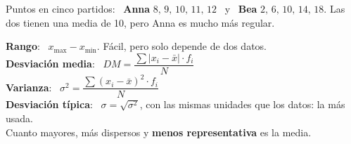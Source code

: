 \documentclass[11pt,a4paper]{article}
\newcommand{\heavy}{\fontseries{eb}\selectfont}
\begin{document}
\vfill
\begin{idea}
Puntos en cinco partidos: \ \textbf{Anna} $8,\,9,\,10,\,11,\,12$ \ y \ \textbf{Bea} $2,\,6,\,10,\,14,\,18$. Las dos tienen una media de 10, pero Anna es mucho más regular.
\end{idea}

\vfill
\begin{minipage}[c]{0.54\linewidth}\small
\textbf{Rango}: \ $x_{\max}-x_{\min}$. Fácil, pero solo depende de dos datos.\\[4pt]
\textbf{Desviación media}: \ $DM=\dfrac{\sum|x_i-\bar x|\cdot f_i}{N}$\\[4pt]
\textbf{Varianza}: \ $\sigma^2=\dfrac{\sum(x_i-\bar x)^2\cdot f_i}{N}$\\[4pt]
\textbf{Desviación típica}: \ $\sigma=\sqrt{\sigma^2}$, con las mismas unidades que los datos: la más usada.\\[4pt]
Cuanto mayores, más dispersos y \textbf{menos representativa} es la media.
\end{minipage}\hfill
\begin{minipage}[c]{0.43\linewidth}\centering
{}
\end{minipage}
\end{document}
